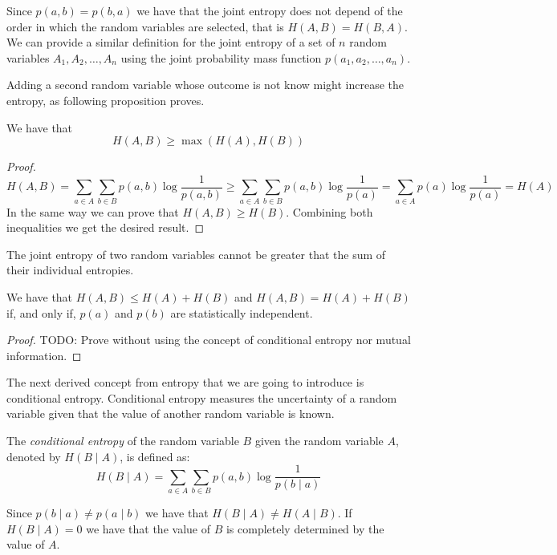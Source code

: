 Since $p(a, b) = p(b, a)$ we have that the joint entropy does not depend of the order in which the random variables are selected, that is $H(A, B) = H(B, A)$. We can provide a similar definition for the joint entropy of a set of $n$ random variables $A_1, A_2, \ldots, A_n$ using the joint probability mass function $p(a_1, a_2, \ldots, a_n)$.

Adding a second random variable whose outcome is not know might increase the entropy, as following proposition proves.

\begin{proposition}
We have that
\[
H(A, B) \geq \max \left( H(A), H(B) \right)
\]
\end{proposition}
\begin{proof}
\[
H(A, B) = \sum_{a \in A} \sum_{b \in B} p(a,b) \log \frac{1}{p(a,b)} \geq \sum_{a \in A} \sum_{b \in B} p(a,b) \log \frac{1}{p(a)} = \sum_{a \in A} p(a) \log \frac{1}{p(a)} = H(A)
\]
In the same way we can prove that $H(A, B) \geq H(B)$. Combining both inequalities we get the desired result.
\end{proof}

The joint entropy of two random variables cannot be greater that the sum of their individual entropies.

\begin{proposition}
\label{prop:joint_entropy}
We have that $H(A, B) \leq H(A) + H(B)$ and $H(A, B) = H(A) + H(B)$ if, and only if, $p(a)$ and $p(b)$ are statistically independent.
\end{proposition}
\begin{proof}
{\color{red} TODO: Prove without using the concept of conditional entropy nor mutual information.}
\end{proof}


The next derived concept from entropy that we are going to introduce is conditional entropy. Conditional entropy measures the uncertainty of a random variable given that the value of another random variable is known.

\begin{definition}
The \emph{conditional entropy} of the random variable $B$ given the random variable $A$, denoted by $H(B \mid A)$, is defined as:
\[
H(B \mid A) = \sum_{a \in A} \sum_{b \in B} p(a, b) \log \frac{1}{p(b \mid a)}
\]
\end{definition}

Since $p(b \mid a) \neq p(a \mid b)$ we have that $H(B \mid A) \neq H(A \mid B)$. If $H(B \mid A) = 0$ we have that the value of $B$ is completely determined by the value of $A$.

